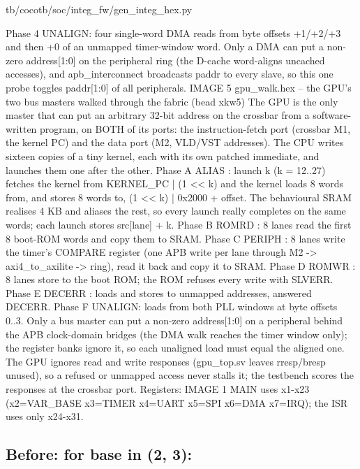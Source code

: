 \begin{relocated}{tb/cocotb/soc/integ_fw/gen_integ_hex.py}
\begin{textblock}
Phase 4 UNALIGN: four single-word DMA reads from byte offsets +1/+2/+3 and then +0 of an unmapped timer-window
word.  Only a DMA can put a non-zero address[1:0] on the peripheral ring (the
D-cache word-aligns uncached accesses), and apb_interconnect broadcasts paddr to
every slave, so this one probe toggles paddr[1:0] of all peripherals.
IMAGE 5  gpu_walk.hex -- the GPU's two bus masters walked through the fabric (bead xkw5)
The GPU is the only master that can put an arbitrary 32-bit address on the crossbar from a
software-written program, on BOTH of its ports: the instruction-fetch port (crossbar M1, the
kernel PC) and the data port (M2, VLD/VST addresses).  The CPU writes sixteen copies of a tiny kernel, each with
its own patched immediate, and launches them one after the other.
Phase A ALIAS  : launch k (k = 12..27) fetches the kernel from KERNEL_PC | (1 << k) and the
kernel loads 8 words from, and stores 8 words to, (1 << k) | 0x2000 + offset.
The behavioural SRAM realises 4 KB and aliases the rest, so every launch
really completes on the same words; each launch stores src[lane] + k.
Phase B ROMRD  : 8 lanes read the first 8 boot-ROM words and copy them to SRAM.
Phase C PERIPH : 8 lanes write the timer's COMPARE register (one APB write per lane through
M2 -> axi4_to_axilite -> ring), read it back and copy it to SRAM.
Phase D ROMWR  : 8 lanes store to the boot ROM; the ROM refuses every write with SLVERR.
Phase E DECERR : loads and stores to unmapped addresses, answered DECERR.
Phase F UNALIGN: loads from both PLL windows at byte offsets 0..3.  Only a bus master can put a
non-zero address[1:0] on a peripheral behind the APB clock-domain bridges (the DMA
walk reaches the timer window only); the register banks ignore it, so each
unaligned load must equal the aligned one.
The GPU ignores read and write responses (gpu_top.sv leaves rresp/bresp unused), so a refused
or unmapped access never stalls it; the testbench scores the responses at the crossbar port.
Registers: IMAGE 1 MAIN uses x1-x23 (x2=VAR_BASE x3=TIMER x4=UART x5=SPI x6=DMA x7=IRQ);
the ISR uses only x24-x31.
\end{textblock}

\subsection*{Before: for base in (2, 3):}


\end{relocated}

